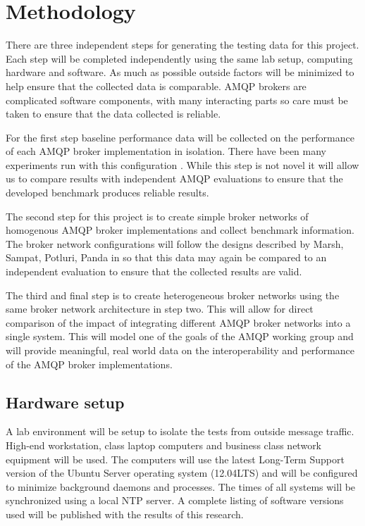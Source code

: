 \documentclass{thesis}
\begin{document}
\chapter{Methodology}
There are three independent steps for generating the testing data for this project.  Each step will be completed independently using the same lab setup, computing hardware and software.  As much as possible outside factors will be minimized to help ensure that the collected data is comparable.  AMQP brokers are complicated software components, with many interacting parts so care must be taken to ensure that the data collected is reliable.  

For the first step baseline performance data will be collected on the performance of each AMQP broker implementation in isolation.  There have been many experiments run with this configuration \cite{BENCHMARK1} \cite{BENCHMARK2}.  While this step is not novel it will allow us to compare results with independent AMQP evaluations to ensure that the developed benchmark produces reliable results. 

The second step for this project is to create simple broker networks of homogenous AMQP broker implementations and collect benchmark information.  The broker network configurations will follow the designs described by  Marsh, Sampat, Potluri, Panda in \cite{Scaling AMQP} so that this data may again be compared to an independent evaluation to ensure that the collected results are valid.

The third and final step is to create heterogeneous broker networks using the same broker network architecture in step two.  This will allow for direct comparison of the impact of integrating different AMQP broker networks into a single system.  This will model one of the goals of the AMQP working group and will provide meaningful, real world data on the interoperability and performance of the AMQP broker implementations. 



\section{Hardware setup}
A lab environment will be setup to isolate the tests from outside message traffic.  High-end workstation, class laptop computers and business class network equipment will be used.  The computers will use the latest Long-Term Support version of the Ubuntu Server operating system (12.04LTS) and will be configured to minimize background daemons and processes.  The times of all systems will be synchronized using a local NTP server. A complete listing of software versions used will be published with the results of this research.
\end{document}
